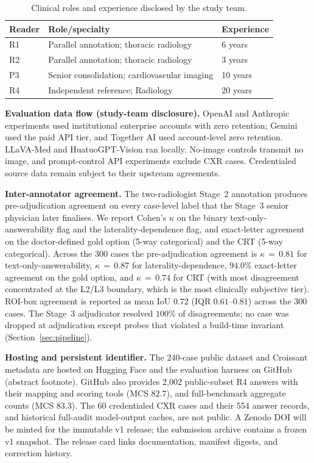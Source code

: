 \documentclass{article}
\begin{document}
\begin{table}[!htbp]
  \centering\small
  \caption{Clinical roles and experience disclosed by the study team.}
  \label{tab:reader_qualifications}
  \begin{tabular}{lll}
    \toprule
    Reader & Role/specialty & Experience \\
    \midrule
    R1 & Parallel annotation; thoracic radiology & 6 years \\
    R2 & Parallel annotation; thoracic radiology & 3 years \\
    P3 & Senior consolidation; cardiovascular imaging & 10 years \\
    R4 & Independent reference; Radiology & 20 years \\
    \bottomrule
  \end{tabular}
\end{table}

\textbf{Evaluation data flow (study-team disclosure).} OpenAI and Anthropic experiments used institutional enterprise accounts with zero retention; Gemini used the paid API tier, and Together AI used account-level zero retention. LLaVA-Med and HuatuoGPT-Vision ran locally. No-image controls transmit no image, and prompt-control API experiments exclude CXR cases. Credentialed source data remain subject to their upstream agreements.

\textbf{Inter-annotator agreement.} The two-radiologist Stage~2 annotation produces pre-adjudication agreement on every case-level label that the Stage~3 senior physician later finalises. We report Cohen's $\kappa$ on the binary text-only-answerability flag and the laterality-dependence flag, and exact-letter agreement on the doctor-defined gold option (5-way categorical) and the CRT (5-way categorical). Across the 300 cases the pre-adjudication agreement is $\kappa\,{=}\,0.81$ for text-only-answerability, $\kappa\,{=}\,0.87$ for laterality-dependence, $94.0\%$ exact-letter agreement on the gold option, and $\kappa\,{=}\,0.74$ for CRT (with most disagreement concentrated at the L2/L3 boundary, which is the most clinically subjective tier). ROI-box agreement is reported as mean IoU $0.72$ (IQR $0.61$--$0.81$) across the 300 cases. The Stage~3 adjudicator resolved $100\%$ of disagreements; no case was dropped at adjudication except probes that violated a build-time invariant (Section~\ref{sec:pipeline}).

\textbf{Hosting and persistent identifier.} The 240-case public dataset and Croissant metadata are hosted on Hugging Face and the evaluation harness on GitHub (abstract footnote). GitHub also provides 2{,}002 public-subset \textsc{R4} answers with their mapping and scoring tools (MCS $82.7$), and full-benchmark aggregate counts (MCS $83.3$). The 60 credentialed CXR cases and their 554 answer records, and historical full-audit model-output caches, are not public. A Zenodo DOI will be minted for the immutable v1 release; the submission archive contains a frozen v1 snapshot. The release card links documentation, manifest digests, and correction history.
\end{document}
